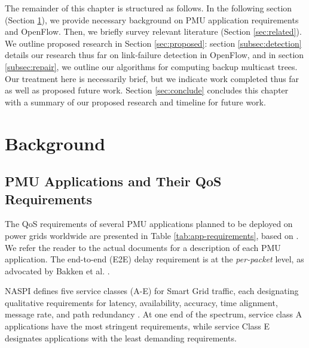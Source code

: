 The remainder of this chapter is structured as follows.  In the following section (Section \ref{sec:background}), we provide necessary background on PMU application requirements and OpenFlow.  
Then, we briefly survey relevant literature (Section \ref{sec:related}).
We outline proposed research in Section \ref{sec:proposed}:
section \ref{subsec:detection} details our research thus far on link-failure detection in OpenFlow, and in section \ref{subsec:repair}, we outline our algorithms for computing backup multicast trees.
Our treatment here is necessarily brief, but we indicate work completed thus far as well as proposed future work.  Section \ref{sec:conclude} concludes this chapter with a summary of our proposed research and 
timeline for future work.
















\section{Background}
\label{sec:background}

\subsection{PMU Applications and Their QoS Requirements} 
\label{subsec:pmu-requirements}

The QoS requirements of several PMU applications planned to be deployed on power grids worldwide are presented in Table \ref{tab:app-requirements}, based on \cite{Bakken11,Kth09}.
We refer the reader to the actual documents for a description of each PMU application.  The end-to-end (E2E) delay requirement is at the \emph{per-packet} level, as advocated by
Bakken et al. \cite{Bakken11}.

NASPI defines five service classes (A-E) for Smart Grid traffic, each designating qualitative requirements for latency, availability, accuracy, time alignment, message rate, 
and path redundancy \cite{Bakken11}. At one end of the spectrum, service class A applications have the most stringent requirements, while service Class E designates applications
with the least demanding requirements.

